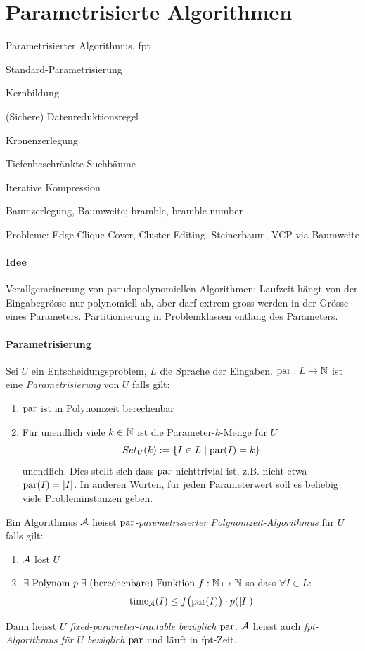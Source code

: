 \section{Parametrisierte Algorithmen}

\begin{takeaway}
    \item Parametrisierter Algorithmus, fpt
    \item Standard-Parametrisierung
    \item Kernbildung
    \item (Sichere) Datenreduktionsregel
    \item Kronenzerlegung
    \item Tiefenbeschränkte Suchbäume
    \item Iterative Kompression
    \item Baumzerlegung, Baumweite; bramble, bramble number
    \item Probleme: Edge Clique Cover, Cluster Editing, Steinerbaum, VCP via Baumweite
\end{takeaway}

\paragraph{Idee}
Verallgemeinerung von pseudopolynomiellen Algorithmen:
Laufzeit hängt von der Eingabegrösse nur polynomiell ab, aber darf extrem gross werden in der Grösse eines Parameters.
Partitionierung in Problemklassen entlang des Parameters.

\paragraph{Parametrisierung}
Sei $U$ ein Entscheidungsproblem, $L$ die Sprache der Eingaben.
$\text{par}: L \mapsto \mathbb{N}$ ist eine \emph{Parametrisierung} von $U$ falls gilt:
\begin{enumerate}[label=(\roman*)]
    \item $\text{par}$ ist in Polynomzeit berechenbar
    \item Für unendlich viele $k \in \mathbb{N}$ ist die Parameter-$k$-Menge für $U$
    $$ Set_U(k) := \{ I \in L \; | \; \text{par}(I) = k \} $$ unendlich.
    Dies stellt sich dass $\text{par}$ nichttrivial ist, z.B. nicht etwa $\text{par}(I) = |I|$.
    In anderen Worten, für jeden Parameterwert soll es beliebig viele Probleminstanzen geben.
\end{enumerate}
Ein Algorithmus $\mathcal{A}$ heisst \emph{$\text{par}$-paremetrisierter Polynomzeit-Algorithmus} für $U$ falls gilt:
\begin{enumerate}[label=(\roman*)]
    \item $\mathcal{A}$ löst $U$
    \item $ \exists \text{ Polynom } p \; \exists \text{ (berechenbare) Funktion } f : \mathbb{N} \mapsto \mathbb{N}$
    so dass $\forall I \in L$:
    $$\text{time}_{\mathcal{A}}(I) \leq f \big( \text{par}(I) \big) \cdot p(|I|) $$
\end{enumerate}
Dann heisst $U$ \emph{fixed-parameter-tractable bezüglich $\text{par}$}.
$\mathcal{A}$ heisst auch \emph{fpt-Algorithmus für $U$ bezüglich $\text{par}$} und läuft in fpt-Zeit.

